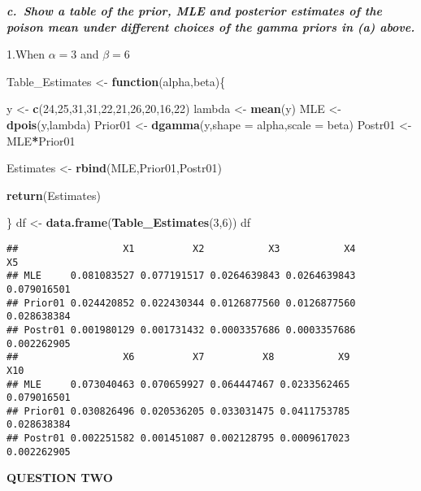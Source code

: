 \documentclass[
]{article}
\newenvironment{Shaded}{\begin{snugshade}}{\end{snugshade}}
\newcommand{\ControlFlowTok}[1]{\textcolor[rgb]{0.13,0.29,0.53}{\textbf{#1}}}
\newcommand{\DataTypeTok}[1]{\textcolor[rgb]{0.13,0.29,0.53}{#1}}
\newcommand{\DecValTok}[1]{\textcolor[rgb]{0.00,0.00,0.81}{#1}}
\newcommand{\KeywordTok}[1]{\textcolor[rgb]{0.13,0.29,0.53}{\textbf{#1}}}
\newcommand{\NormalTok}[1]{#1}
\newcommand{\OperatorTok}[1]{\textcolor[rgb]{0.81,0.36,0.00}{\textbf{#1}}}
\newcommand{\StringTok}[1]{\textcolor[rgb]{0.31,0.60,0.02}{#1}}
\begin{document}
\textbf{\emph{c.~Show a table of the prior, MLE and posterior estimates
of the poison mean under different choices of the gamma priors in (a)
above.}}

1.When \(\alpha=3\) and \(\beta=6\)

\begin{Shaded}
\begin{Highlighting}[]
\NormalTok{Table_Estimates <-}\StringTok{ }\ControlFlowTok{function}\NormalTok{(alpha,beta)\{}
  
\NormalTok{y <-}\StringTok{ }\KeywordTok{c}\NormalTok{(}\DecValTok{24}\NormalTok{,}\DecValTok{25}\NormalTok{,}\DecValTok{31}\NormalTok{,}\DecValTok{31}\NormalTok{,}\DecValTok{22}\NormalTok{,}\DecValTok{21}\NormalTok{,}\DecValTok{26}\NormalTok{,}\DecValTok{20}\NormalTok{,}\DecValTok{16}\NormalTok{,}\DecValTok{22}\NormalTok{)}
\NormalTok{lambda <-}\StringTok{ }\KeywordTok{mean}\NormalTok{(y)}
\NormalTok{MLE <-}\StringTok{ }\KeywordTok{dpois}\NormalTok{(y,lambda)}
\NormalTok{Prior01 <-}\StringTok{ }\KeywordTok{dgamma}\NormalTok{(y,}\DataTypeTok{shape =}\NormalTok{ alpha,}\DataTypeTok{scale =}\NormalTok{ beta)}
\NormalTok{Postr01 <-}\StringTok{ }\NormalTok{MLE}\OperatorTok{*}\NormalTok{Prior01}

\NormalTok{Estimates <-}\StringTok{ }\KeywordTok{rbind}\NormalTok{(MLE,Prior01,Postr01)}

\KeywordTok{return}\NormalTok{(Estimates)}

\NormalTok{\}}
\NormalTok{df <-}\StringTok{ }\KeywordTok{data.frame}\NormalTok{(}\KeywordTok{Table_Estimates}\NormalTok{(}\DecValTok{3}\NormalTok{,}\DecValTok{6}\NormalTok{))}
\NormalTok{df}
\end{Highlighting}
\end{Shaded}

\begin{verbatim}
##                  X1          X2           X3           X4          X5
## MLE     0.081083527 0.077191517 0.0264639843 0.0264639843 0.079016501
## Prior01 0.024420852 0.022430344 0.0126877560 0.0126877560 0.028638384
## Postr01 0.001980129 0.001731432 0.0003357686 0.0003357686 0.002262905
##                  X6          X7          X8           X9         X10
## MLE     0.073040463 0.070659927 0.064447467 0.0233562465 0.079016501
## Prior01 0.030826496 0.020536205 0.033031475 0.0411753785 0.028638384
## Postr01 0.002251582 0.001451087 0.002128795 0.0009617023 0.002262905
\end{verbatim}

\textbf{QUESTION TWO}
\end{document}
